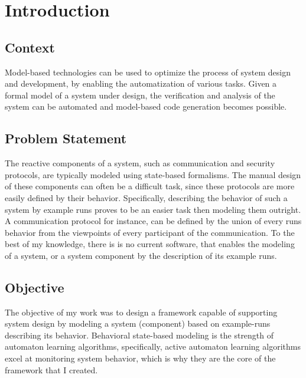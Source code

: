 \chapter{Introduction}

\section{Context}

Model-based technologies can be used to optimize the process of system design and development, by enabling the automatization of various tasks. Given a formal model of a system under design, the verification and analysis of the system can be automated and model-based code generation becomes possible.

\section{Problem Statement}

The reactive components of a system, such as communication and security protocols, are typically modeled using state-based formalisms. The manual design of these components can often be a difficult task, since these protocols are more easily defined by their behavior. Specifically, describing the behavior of such a system by example runs proves to be an easier task then modeling them outright. A communication protocol for instance, can be defined by the union of every runs behavior from the viewpoints of every participant of the communication. To the best of my knowledge, there is is no current software, that enables the modeling of a system, or a system component by the description of its example runs.

\section{Objective}

The objective of my work was to design a framework capable of supporting system design by modeling a system (component) based on example-runs describing its behavior. Behavioral state-based modeling is the strength of automaton learning algorithms, specifically, active automaton learning algorithms excel at monitoring system behavior, which is why they are the core of the framework that I created.

